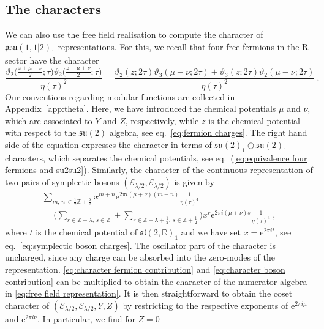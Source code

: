 \documentclass[12pt,a4paper]{article}
\newcommand{\be}{\begin{equation}}
\newcommand{\ee}{\end{equation}}
\begin{document}
\subsection{The characters} \label{subapp:characters}

We can also use the free field realisation to compute the character of $\mathfrak{psu}(1,1|2)_1$-representations. For this, we recall that four free fermions in the R-sector have the character
\be 
\frac{\vartheta_2\big(\frac{z+\mu-\nu}{2};\tau\big)\vartheta_2\big(\frac{z-\mu+\nu}{2};\tau\big)}{\eta(\tau)^2}=\frac{\vartheta_2(z;2\tau)\vartheta_3(\mu-\nu;2\tau)+\vartheta_3(z;2\tau)\vartheta_2(\mu-\nu;2\tau)}{\eta(\tau)^2}\ . \label{eq:character fermion contribution}
\ee
Our conventions regarding modular functions are collected in Appendix~\ref{app:theta}. Here, we have introduced the chemical potentials $\mu$ and $\nu$, which are associated to $Y$ and $Z$, respectively, while $z$ is the chemical potential with respect to the $\mathfrak{su}(2)$ algebra, see eq.~\eqref{eq:fermion charges}. The right hand side of the equation expresses the character in terms of $\mathfrak{su}(2)_1 \oplus \mathfrak{su}(2)_1$-characters, which separates the chemical potentials, see eq.~(\ref{eq:equivalence four fermions and su2su2}). Similarly, the character of the continuous representation of two pairs of symplectic bosons $(\mathscr{E}_{\lambda/2},\mathscr{E}_{\lambda/2})$ is given by
\begin{multline} 
\sum_{m,\, n \, \in \frac{1}{2}\mathds{Z}+\frac{\lambda}{2}} x^{m+n} \mathrm{e}^{2\pi i(\mu+\nu)(m-n)} \frac{1}{\eta(\tau)^4}\\
=\Bigg(\sum_{r \in \mathds{Z}+\lambda,\, s\in \mathds{Z}}+\sum_{r \in \mathds{Z}+\lambda+\frac{1}{2},\, s\in \mathds{Z}+\frac{1}{2}}\Bigg) x^r \mathrm{e}^{2\pi i(\mu+\nu)s}\frac{1}{\eta(\tau)^4}\ , \label{eq:character boson contribution}
\end{multline}
where $t$ is the chemical potential of $\mathfrak{sl}(2,\mathds{R})_1$ and we have set $x=\mathrm{e}^{2\pi i t}$, see eq.~\eqref{eq:symplectic boson charges}. 
The oscillator part of the character is uncharged, since any charge can be absorbed into the zero-modes of the representation. \eqref{eq:character fermion contribution} and \eqref{eq:character boson contribution} can be multiplied to obtain the character of the numerator algebra in \eqref{eq:free field representation}.  It is then straightforward to obtain the coset character of $(\mathscr{E}_{\lambda/2},\mathscr{E}_{\lambda/2},Y,Z)$ by restricting to the respective exponents of $\mathrm{e}^{2\pi i\mu}$ and $\mathrm{e}^{2\pi i\nu}$. In particular, we find for $Z=0$
\end{document}
